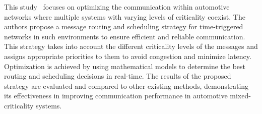    This study~\cite{smirnov2017optimizing} focuses on optimizing the communication within automotive networks where multiple systems with varying levels of criticality coexist. 
   The authors propose a message routing and scheduling strategy for time-triggered networks in such environments to ensure efficient and reliable communication. This strategy takes into account the different criticality levels of the messages and assigns appropriate priorities to them to avoid congestion and minimize latency. Optimization is achieved by using mathematical models to determine the best routing and scheduling decisions in real-time. The results of the proposed strategy are evaluated and compared to other existing methods, demonstrating its effectiveness in improving communication performance in automotive mixed-criticality systems.



  
  
